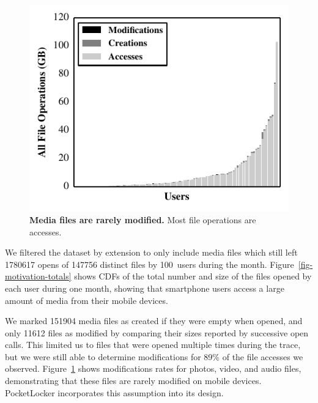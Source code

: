 \begin{figure}[t]

\includegraphics{./figures/pocketlocker/OperationPercentageGraph.pdf}

\caption{\small \textbf{Media files are rarely modified.} Most file
operations are accesses.}

\label{fig-motivation-modification}
\vspace*{-0.2in}

\end{figure}

We filtered the dataset by extension to only include media files
which still left \num{1780617} opens of
\num{147756} distinct files by 100~users during the month.
Figure~\ref{fig-motivation-totals} shows CDFs of the total number and size of
the files opened by each \PhoneLab{} user during one month, showing that
smartphone users access a large amount of media from their mobile
devices.

We marked \num{151904} media files as created if they were empty when opened,
and only \num{11612} files as modified by comparing their sizes reported by
successive open calls. This limited us to files that were opened multiple
times during the trace, but we were still able to determine modifications for
89\% of the file accesses we observed.
Figure~\ref{fig-motivation-modification} shows modifications rates for
photos, video, and audio files, demonstrating that these files are rarely
modified on mobile devices. PocketLocker incorporates this assumption into
its design.

